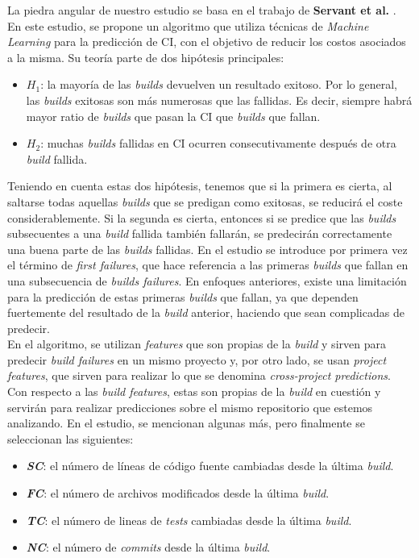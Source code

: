 La piedra angular de nuestro estudio se basa en el trabajo de \textbf{Servant et al.} \cite{2}. En
este estudio, se propone un algoritmo que utiliza técnicas de \textit{Machine Learning}
para la predicción de CI, con el objetivo de reducir los costos asociados a la misma.
Su teoría parte de dos hipótesis principales:

\begin{itemize}
      \item \textit{$H_1$}: la mayoría de las \textit{builds} devuelven un resultado exitoso. Por
      lo general, las \textit{builds} exitosas son más numerosas que las fallidas. Es decir,
      siempre habrá mayor ratio de \textit{builds} que pasan la CI que \textit{builds}
      que fallan.
      \item \textit{$H_2$}: muchas \textit{builds} fallidas en CI ocurren
      consecutivamente después de otra \textit{build} fallida.
\end{itemize}

Teniendo en cuenta estas dos hipótesis, tenemos que si la primera es cierta, al saltarse todas
aquellas \textit{builds} que se predigan como exitosas, se reducirá el coste considerablemente.
Si la segunda es cierta, entonces si se predice que las \textit{builds} subsecuentes a una
\textit{build} fallida también fallarán, se predecirán correctamente una buena parte de las
\textit{builds} fallidas. En el estudio se introduce por primera vez el término de \textit{first
failures}, que hace referencia a las primeras \textit{builds} que fallan en una subsecuencia de
\textit{builds failures}. En enfoques anteriores, existe una limitación para la predicción
de estas primeras \textit{builds} que fallan, ya que dependen fuertemente del resultado de la
\textit{build} anterior, haciendo que sean complicadas de predecir.\\

En el algoritmo, se utilizan \textit{features} que son propias de la \textit{build} y
sirven para predecir \textit{build failures} en un mismo proyecto y, por otro lado, se usan
\textit{project features}, que sirven para realizar lo que se denomina \textit{cross-project
predictions}. Con respecto a las \textit{build features}, estas son propias de la \textit{build}
en cuestión y servirán para realizar predicciones sobre el mismo repositorio que estemos
analizando. En el estudio, se mencionan algunas más, pero finalmente se seleccionan las
siguientes:

\begin{itemize}
      \item \textbf{\textit{SC}}: el número de líneas de código fuente cambiadas desde la
      última \textit{build}.
      \item \textbf{\textit{FC}}: el número de archivos modificados desde la última
      \textit{build}.
      \item \textbf{\textit{TC}}: el número de lineas de \textit{tests} cambiadas desde la
      última \textit{build}.
      \item \textbf{\textit{NC}}: el número de \textit{commits} desde la última \textit{build}.
\end{itemize}

